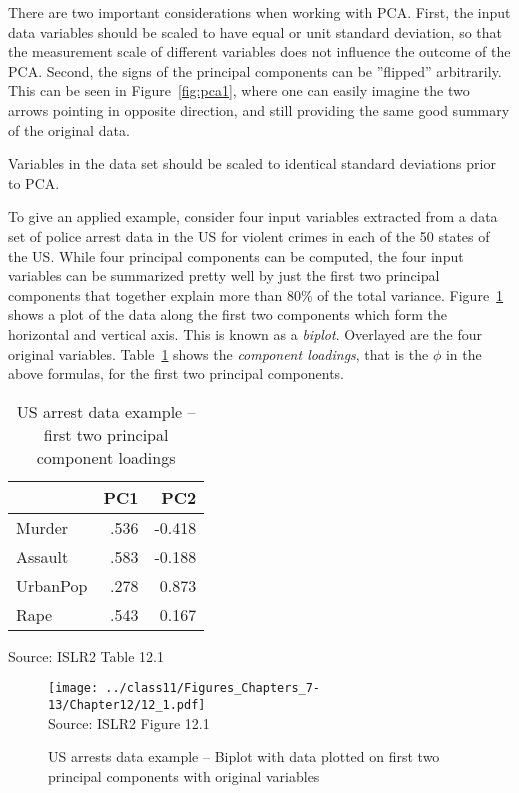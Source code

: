 There are two important considerations when working with PCA. First, the input data variables should be scaled to have equal or unit standard deviation, so that the measurement scale of different variables does not influence the outcome of the PCA. Second, the signs of the principal components can be ''flipped'' arbitrarily. This can be seen in Figure~\ref{fig:pca1}, where one can easily imagine the two arrows pointing in opposite direction, and still providing the same good summary of the original data. 

\begin{tcolorbox}[colback=alert]
Variables in the data set should be scaled to identical standard deviations prior to PCA.
\end{tcolorbox}

To give an applied example, consider four input variables extracted from a data set of police arrest data in the US for violent crimes in each of the 50 states of the US. While four principal components can be computed, the four input variables can be summarized pretty well by just the first two principal components that together explain more than 80\% of the total variance. Figure~\ref{fig:pca2} shows a plot of the data along the first two components which form the horizontal and vertical axis. This is known as a \emph{biplot}. Overlayed are the four original variables. Table~\ref{tab:pca} shows the \emph{component loadings}, that is the $\phi$ in the above formulas, for the first two principal components. 

\begin{table}[b]
\renewcommand{\arraystretch}{1.2}
\centering
\begin{tabular}{l|r|r}
          &  PC1 & PC2 \\ \hline
Murder    & .536  & -0.418 \\
Assault   & .583  & -0.188 \\
UrbanPop  & .278  & 0.873 \\ 
Rape      & .543 & 0.167 \\ \hline
\end{tabular}

\scriptsize \vspace{\baselineskip} Source: ISLR2 Table 12.1
\caption{US arrest data example -- first two principal component loadings}
\label{tab:pca}
\end{table}

\begin{figure}
\centering
\texttt{[image: ../class11/Figures\_Chapters\_7-13/Chapter12/12\_1.pdf]} \\

\scriptsize Source: ISLR2 Figure 12.1
\caption[US arrests data example -- Biplot]{US arrests data example -- Biplot with data plotted on first two principal components with original variables}
\label{fig:pca2}
\end{figure}


